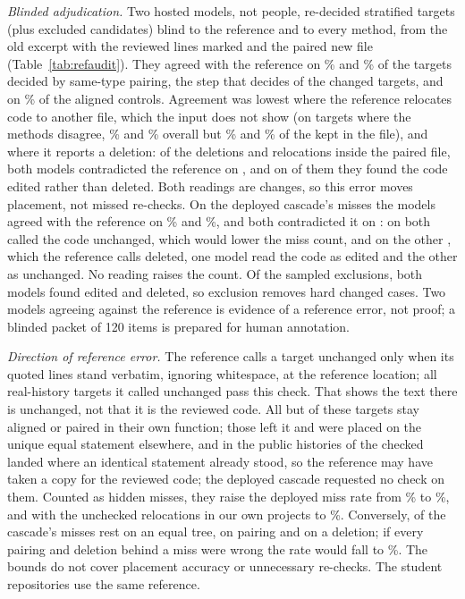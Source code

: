 \emph{Blinded adjudication.}\label{sec:refaudit} Two hosted models, not people, re-decided \wrAllN{} stratified targets (plus \wrExclN{} excluded candidates) blind to the reference and to every method, from the old excerpt with the reviewed lines marked and the paired new file (Table~\ref{tab:refaudit}). They agreed with the reference on \wrPairBeamStatus\% and \wrPairNemoStatus\% of the targets decided by same-type pairing, the step that decides  of the  changed targets, and on \wrAlignedBeamStatus\% of the aligned controls. Agreement was lowest where the reference relocates code to another file, which the input does not show (on targets where the methods disagree, \wrDisBeamStatus\% and \wrDisNemoStatus\% overall but \wrDisWithinBeamStatus\% and \wrDisWithinNemoStatus\% of the \wrDisWithinN{} kept in the file), and where it reports a deletion: of the \wrDelWithinN{} deletions and relocations inside the paired file, both models contradicted the reference on \wrDelWithinSuspect{}, and on \wrDelWithinEdited{} of them they found the code edited rather than deleted. Both readings are changes, so this error moves placement, not missed re-checks. On the deployed cascade's \wrMissN{} misses the models agreed with the reference on \wrMissBeamStatus\% and \wrMissNemoStatus\%, and both contradicted it on \wrMissSuspect{}: on \wrMissLowering{} both called the code unchanged, which would lower the miss count, and on the other \wrMissOther{}, which the reference calls deleted, one model read the code as edited and the other as unchanged. No reading raises the count. Of the \wrExclN{} sampled exclusions, both models found \wrExclEdited{} edited and \wrExclDeleted{} deleted, so exclusion removes hard changed cases. Two models agreeing against the reference is evidence of a reference error, not proof; a blinded packet of 120 items is prepared for human annotation.

\emph{Direction of reference error.} The reference calls a target unchanged only when its quoted lines stand verbatim, ignoring whitespace, at the reference location; all  real-history targets it called unchanged pass this check. That shows the text there is unchanged, not that it is the reviewed code. All but  of these targets stay aligned or paired in their own function; those  left it and were placed on the unique equal statement elsewhere, and in the public histories  of the  checked landed where an identical statement already stood, so the reference may have taken a copy for the reviewed code; the deployed cascade requested no check on them. Counted as hidden misses, they raise the deployed miss rate from \% to \%, and with the  unchecked relocations in our own projects to \%. Conversely, of the cascade's \wpaMissTotal{} misses  rest on an equal tree,  on pairing and  on a deletion; if every pairing and deletion behind a miss were wrong the rate would fall to \%. The bounds do not cover placement accuracy or unnecessary re-checks. The student repositories use the same reference.

